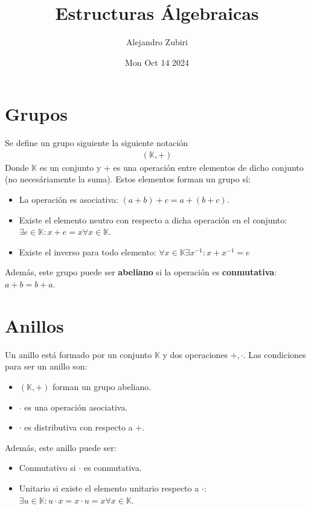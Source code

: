 \documentclass{article}
\author{Alejandro Zubiri}
\date{Mon Oct 14 2024}
\title{Estructuras Álgebraicas}
\newtheorem{caracteristica primo}{Teorema}
\begin{document}
\maketitle
\section{Grupos}
Se define un grupo siguiente la siguiente notación
\begin{equation}
    \begin{split}
        (\mathbb{K}, +)
    \end{split}
\end{equation}
Donde $\mathbb{K}$ es un conjunto y $+$ es una operación entre elementos de dicho conjunto (no 
necesáriamente la suma). Estos elementos forman un grupo sí:
\begin{itemize}
    \item La operación es asociativa: $(a+b)+c=a+(b+c)$.
    \item Existe el elemento neutro con respecto a dicha operación en el conjunto:
    $\exists e \in \mathbb{K} : x+e=x \forall x \in \mathbb{K}$.
    \item Existe el inverso para todo elemento: $\forall x \in \mathbb{K} \exists x^{-1} : x+x^{-1} = e$ 
\end{itemize}
Además, este grupo puede ser \textbf{abeliano} si la operación es \textbf{conmutativa}: $a+b=b+a$.
\section{Anillos}
Un anillo está formado por un conjunto $\mathbb{K}$ y dos operaciones $+, \cdot $. Las condiciones
para ser un anillo son:
\begin{itemize}
    \item $(\mathbb{K}, +)$ forman un grupo abeliano.
    \item $ \cdot $ es una operación asociativa.
    \item $ \cdot $ es distributiva con respecto a $+$.
\end{itemize}
Además, este anillo puede ser:
\begin{itemize}
    \item Conmutativo si $ \cdot $ es conmutativa.
    \item Unitario si existe el elemento unitario respecto a $ \cdot $: $\exists u \in \mathbb{K} :
    u \cdot x= x \cdot u = x\forall x \in \mathbb{K}$. 
\end{itemize}
\end{document}
